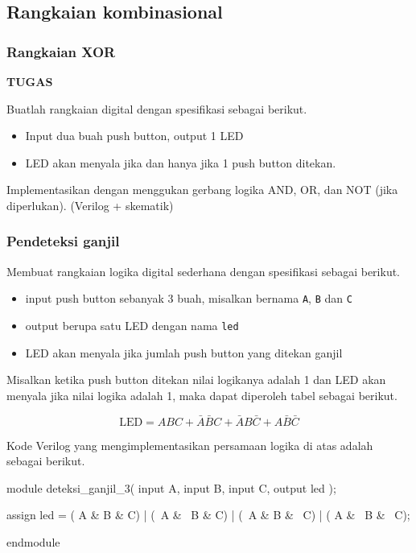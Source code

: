 \subsection{Rangkaian kombinasional}

\subsubsection{Rangkaian XOR}

\textbf{TUGAS}

Buatlah rangkaian digital dengan spesifikasi sebagai berikut.
\begin{itemize}
\item Input dua buah push button, output 1 LED
\item LED akan menyala jika dan hanya jika 1 push button ditekan.
\end{itemize}

Implementasikan dengan menggukan gerbang logika AND, OR, dan NOT
(jika diperlukan). (Verilog + skematik)

\subsubsection{Pendeteksi ganjil}

Membuat rangkaian logika digital sederhana dengan spesifikasi sebagai berikut.

\begin{itemize}
\item input push button sebanyak 3 buah, misalkan bernama {\tt A}, {\tt B}
dan {\tt C}
\item output berupa satu LED dengan nama {\tt led}
\item LED akan menyala jika jumlah push button
yang ditekan ganjil
\end{itemize}

Misalkan ketika push button ditekan nilai logikanya adalah 1 dan 
LED akan menyala jika nilai logika adalah 1, maka dapat diperoleh tabel
sebagai berikut.



\begin{equation*}
\mathrm{LED} = ABC + \bar{A}\bar{B}C + \bar{A}B\bar{C} + A\bar{B}\bar{C}
\end{equation*}

Kode Verilog yang mengimplementasikan persamaan logika di atas adalah
sebagai berikut.
\begin{verilogcode}
module deteksi_ganjil_3(
  input A, input B, input C,
  output led );

  assign led = ( A & B &  C) | (~A & ~B &  C) | 
               (~A & B & ~C) | ( A & ~B & ~C);

endmodule
\end{verilogcode}

